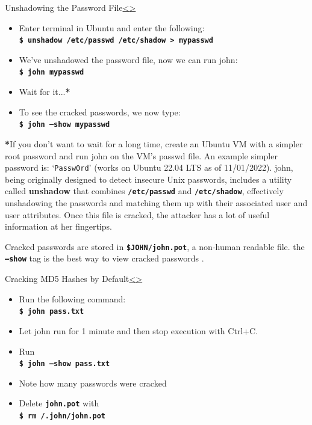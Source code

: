 \documentclass[12pt]{extarticle}
\newcommand{\code}[1]{\texttt{\bfseries#1}}
\newenvironment{instructionblock}{\Large\bgroup}{\egroup}
\begin{document}
\pagebreak
\begin{slide}{Unshadowing the Password File}{\hyperref[slide 8]{\textless}\hyperref[slide 10]{\textgreater}}
	\begin{instructionblock}
		\begin{itemize}
			\item Enter terminal in Ubuntu and enter the following:\\
				\code{\$ unshadow /etc/passwd /etc/shadow > mypasswd} 	
			\item We've unshadowed the password file, now we can run john:\\
				\code{\$ john mypasswd}
			\item{Wait for it...\textbf{*}}
			\item{To see the cracked passwords, we now type:}\\
				\code{\$ john --show mypasswd}
		\end{itemize}
	\end{instructionblock}
\end{slide}
\textbf{*}If you don't want to wait for a long time, create an Ubuntu VM with a simpler root password and run john on the VM's passwd file. An example simpler password is: `\texttt{Passw0rd}' (works on Ubuntu 22.04 LTS as of 11/01/2022).
\vfill
john, being originally designed to detect insecure Unix passwords, includes a utility called \textbf{unshadow} that combines \code{/etc/passwd} and \code{/etc/shadow}, effectively unshadowing the passwords and matching them up with their associated user and user attributes. Once this file is cracked, the attacker has a lot of useful information at her fingertips. \cite{john}

Cracked passwords are stored in \code{\$JOHN/john.pot}, a non-human readable file. the \code{--show} tag is the best way to view cracked passwords \cite{john}.

\pagebreak
\begin{slide}{Cracking MD5 Hashes by Default}{\hyperref[slide 9]{\textless}\hyperref[slide 11]{\textgreater}}

	\begin{instructionblock}
	\begin{itemize}
		\item Run the following command:\\
			\code{\$ john pass.txt}
		\item Let john run for 1 minute and then stop execution with Ctrl+C.
		\item Run \\ \code{\$ john --show pass.txt}
		\item Note how many passwords were cracked
		\item Delete \code{john.pot} with\\
		\code{\$ rm \texttildelow/.john/john.pot}
	\end{itemize}
	\end{instructionblock}
\end{slide}
\vfill
\end{document}
